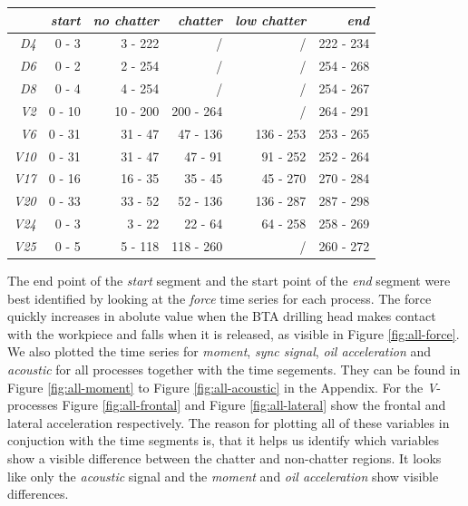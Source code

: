 \documentclass[12 pt]{scrartcl}
\begin{document}
\begin{table}[ht]
  \centering
  \label{tab:segmenttime}
  \begin{tabular}{r|rrrrr}
               & \emph{start} & \emph{no chatter} & \emph{chatter} & \emph{low chatter} & \emph{end} \\
    \hline
    \emph{D4}  & 0 - 3        & 3  - 222          & /              & /                  & 222 - 234  \\
    \emph{D6}  & 0 - 2        & 2  - 254          & /              & /                  & 254 - 268  \\
    \emph{D8}  & 0 - 4        & 4  - 254          & /              & /                  & 254 - 267  \\
    \emph{V2}  & 0 - 10       & 10 - 200          & 200 - 264      & /                  & 264 - 291  \\
    \emph{V6}  & 0 - 31       & 31 - 47           & 47  - 136      & 136 - 253          & 253 - 265  \\
    \emph{V10} & 0 - 31       & 31 - 47           & 47  - 91       & 91  - 252          & 252 - 264  \\
    \emph{V17} & 0 - 16       & 16 - 35           & 35  - 45       & 45  - 270          & 270 - 284  \\
    \emph{V20} & 0 - 33       & 33 - 52           & 52  - 136      & 136 - 287          & 287 - 298  \\
    \emph{V24} & 0 - 3        & 3  - 22           & 22  - 64       & 64  - 258          & 258 - 269  \\
    \emph{V25} & 0 - 5        & 5  - 118          & 118 - 260      & /                  & 260 - 272  \\
  \end{tabular}
\end{table}

The end point of the \emph{start} segment and the start point of the \emph{end} segment were best identified by looking at the \emph{force} time series for each process. The force quickly increases in abolute value when the BTA drilling head makes contact with the workpiece and falls when it is released, as visible in Figure \ref{fig:all-force}.
We also plotted the time series for \emph{moment}, \emph{sync signal}, \emph{oil acceleration} and \emph{acoustic} for all processes together with the time segements. They can be found in Figure \ref{fig:all-moment} to Figure \ref{fig:all-acoustic} in the Appendix. For the \emph{V}-processes Figure \ref{fig:all-frontal} and Figure \ref{fig:all-lateral} show the frontal and lateral acceleration respectively. The reason for plotting all of these variables in conjuction with the time segments is, that it helps us identify which variables show a visible difference between the chatter and non-chatter regions. It looks like only the \emph{acoustic} signal and the \emph{moment} and \emph{oil acceleration} show visible differences.
\end{document}
